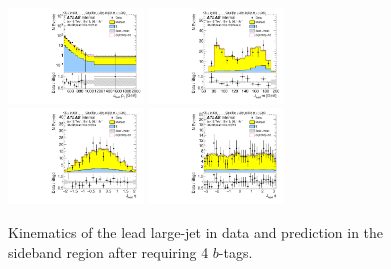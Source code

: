\begin{figure}[htbp!]
\begin{center}
\includegraphics[width=0.32\textwidth,angle=-90]{figures/boosted/Sideband/b77_FourTag_Sideband_leadHCand_Pt_m_1.pdf}
\includegraphics[width=0.32\textwidth,angle=-90]{figures/boosted/Sideband/b77_FourTag_Sideband_leadHCand_Mass_s.pdf}\\
\includegraphics[width=0.32\textwidth,angle=-90]{figures/boosted/Sideband/b77_FourTag_Sideband_leadHCand_Eta.pdf}
\includegraphics[width=0.32\textwidth,angle=-90]{figures/boosted/Sideband/b77_FourTag_Sideband_leadHCand_Phi.pdf}
  \caption{Kinematics of the lead large-\R jet in data and prediction in the sideband region after requiring 4 $b$-tags.}
  \label{fig:boosted-4b-sideband-ak10-lead}
\end{center}
\end{figure}

